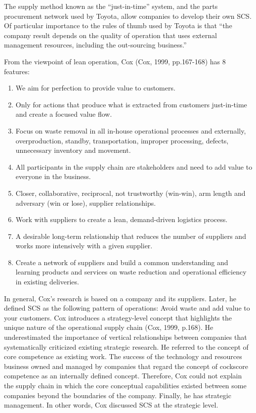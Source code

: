 \documentclass[12pt,]{article}
\begin{document}
The supply method known as the ``just-in-time'' system, and the parts
procurement network used by Toyota, allow companies to develop their own
SCS. Of particular importance to the rules of thumb used by Toyota is
that ``the company result depends on the quality of operation that uses
external management resources, including the out-sourcing business.''

From the viewpoint of lean operation, Cox (Cox, 1999, pp.167-168) has 8
features:

\begin{enumerate}
\def\labelenumi{(\arabic{enumi})}
\item
  We aim for perfection to provide value to customers.
\item
  Only for actions that produce what is extracted from customers
  just-in-time and create a focused value flow.
\item
  Focus on waste removal in all in-house operational processes and
  externally, overproduction, standby, transportation, improper
  processing, defects, unnecessary inventory and movement.
\item
  All participants in the supply chain are stakeholders and need to add
  value to everyone in the business.
\item
  Closer, collaborative, reciprocal, not trustworthy (win-win), arm
  length and adversary (win or lose), supplier relationships.
\item
  Work with suppliers to create a lean, demand-driven logistics process.
\item
  A desirable long-term relationship that reduces the number of
  suppliers and works more intensively with a given supplier.
\item
  Create a network of suppliers and build a common understanding and
  learning products and services on waste reduction and operational
  efficiency in existing deliveries.
\end{enumerate}

In general, Cox's research is based on a company and its suppliers.
Later, he defined SCS as the following pattern of operations: Avoid
waste and add value to your customers. Cox introduces a strategy-level
concept that highlights the unique nature of the operational supply
chain (Cox, 1999, p.168). He underestimated the importance of vertical
relationships between companies that systematically criticized existing
strategic research. He referred to the concept of core competence as
existing work. The success of the technology and resources business
owned and managed by companies that regard the concept of cockscore
competence as an internally defined concept. Therefore, Cox could not
explain the supply chain in which the core conceptual capabilities
existed between some companies beyond the boundaries of the company.
Finally, he has strategic management. In other words, Cox discussed SCS
at the strategic level.
\end{document}
